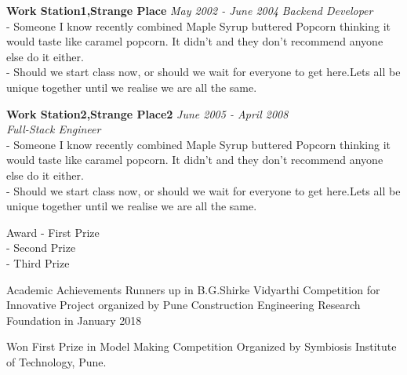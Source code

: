 \documentclass{resume} %
\begin{document}



{\bf Work Station1,Strange Place } \hfill {\em May 2002 - June 2004} 
{\textit{Backend Developer}}\\
- Someone I know recently combined Maple Syrup  buttered Popcorn thinking it would taste like caramel popcorn. It didn’t and they don’t recommend anyone else do it either.
\\- Should we start class now, or should we wait for everyone to get here.Lets all be unique together until we realise we are all the same.

{\bf Work Station2,Strange Place2} \hfill {\em June 2005 - April 2008} 
\\{\textit{Full-Stack Engineer}}
\\- Someone I know recently combined Maple Syrup buttered Popcorn thinking it would taste like caramel popcorn. It didn’t and they don’t recommend anyone else do it either.
\\- Should we start class now, or should we wait for everyone to get here.Lets all be unique together until we realise we are all the same.




\begin{rSection}{Award}
- First Prize\\
- Second Prize\\
- Third Prize\\
\end{rSection}


\begin{rSection}{Academic Achievements} 
 Runners up in B.G.Shirke Vidyarthi Competition for Innovative Project organized by Pune Construction Engineering Research Foundation in January 2018
\item Won First Prize in Model Making Competition Organized by Symbiosis Institute of Technology, Pune.
\end{rSection}
\end{document}

